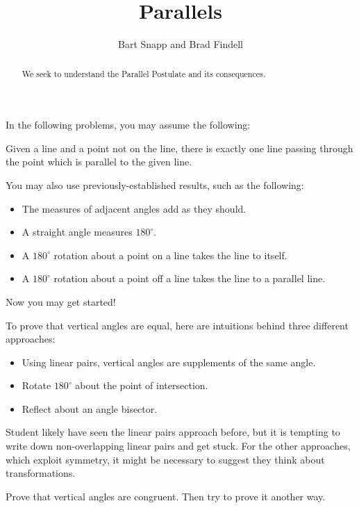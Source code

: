 \documentclass[nooutcomes]{ximera}
\title{Parallels}
\author{Bart Snapp and Brad Findell}
\begin{document}
\begin{abstract}
  We seek to understand the Parallel Postulate and its consequences.
\end{abstract}
\maketitle

In the following problems, you may assume the following: 

\begin{postulate}
Given a line and a point not on the line, there is exactly one line passing through the point which is parallel to the given line.
\end{postulate}

You may also use previously-established results, such as the following: 
\begin{itemize}
\itemsep -3pt
\item The measures of adjacent angles add as they should.
\item A straight angle measures $180^\circ$.  
\item A $180^\circ$ rotation about a point on a line takes the line to itself.  
\item A $180^\circ$ rotation about a point off a line takes the line to a parallel line.  
\end{itemize}

Now you may get started! 

\begin{teachingnote}
To prove that vertical angles are equal, here are intuitions behind three different approaches: 
\begin{itemize}
\item Using linear pairs, vertical angles are supplements of the same angle.  
\item Rotate $180^\circ$ about the point of intersection. 
\item Reflect about an angle bisector. 
\end{itemize}
Student likely have seen the linear pairs approach before, but it is tempting to write down non-overlapping linear pairs and get stuck.  For the other approaches, which exploit symmetry, it might be necessary to suggest they think about transformations.  
\end{teachingnote}

\begin{problem}
Prove that vertical angles are congruent.  Then try to prove it another way.  
\vfill
\end{problem}
\end{document}
